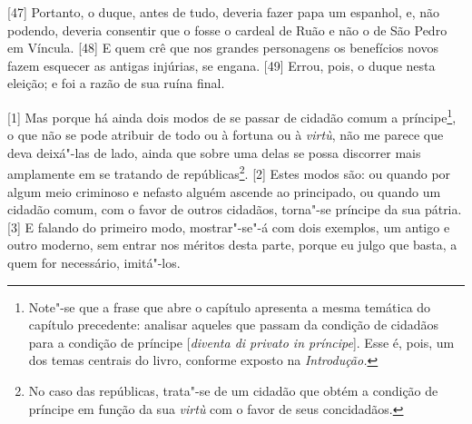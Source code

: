 \quebra

{[}47{]}
Portanto, o duque, antes de tudo, deveria fazer papa um espanhol, e, não
podendo, deveria consentir que o fosse o cardeal de Ruão e não o de São
Pedro em Víncula. {[}48{]} E quem crê que nos grandes personagens os 
benefícios novos fazem esquecer as antigas injúrias, se engana. {[}49{]}
Errou, pois, o duque nesta eleição; e foi a razão de sua ruína final.


{[}1{]} Mas porque há ainda dois modos de se passar de cidadão comum a
príncipe\footnote{Note"-se que a frase que abre o capítulo apresenta a
  mesma temática do capítulo precedente: analisar aqueles que passam da
  condição de cidadãos para a condição de príncipe {[}\emph{diventa di
  privato in príncipe}{]}. Esse é, pois, um dos temas centrais do livro,
  conforme exposto na \emph{Introdução.}}, o que não se pode atribuir de
todo ou à fortuna ou à \emph{virtù}, não me parece que deva deixá"-las de
lado, ainda que sobre uma delas se possa discorrer mais amplamente em se
tratando de repúblicas\footnote{No caso das repúblicas, trata"-se de um
  cidadão que obtém a condição de príncipe em função da sua \emph{virtù}
  com o favor de seus concidadãos.}. {[}2{]} Estes modos são: ou quando
por algum meio criminoso e nefasto alguém ascende ao principado, ou
quando um cidadão comum, com o favor de outros cidadãos, torna"-se
príncipe da sua pátria. {[}3{]} E falando do primeiro modo, mostrar"-se"-á
com dois exemplos, um antigo e outro moderno, sem entrar nos méritos
desta parte, porque eu julgo que basta, a quem for necessário,
imitá"-los.

